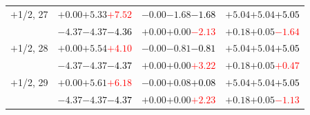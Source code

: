 \documentclass[compress]{beamer}
\begin{document}
\begin{frame}
\begin{tabular}{r | c | c | c}
$+$1/2, 27 & $+0.00$\hspace{0.1 cm}$+5.33$\hspace{0.1 cm}\textcolor{red}{$+7.52$} & $-0.00$\hspace{0.1 cm}$-1.68$\hspace{0.1 cm}\textcolor{black}{$-1.68$} & $+5.04$\hspace{0.1 cm}$+5.04$\hspace{0.1 cm}\textcolor{black}{$+5.05$} \\
           & $-4.37$\hspace{0.1 cm}$-4.37$\hspace{0.1 cm}\textcolor{black}{$-4.36$} & $+0.00$\hspace{0.1 cm}$+0.00$\hspace{0.1 cm}\textcolor{red}{$-2.13$} & $+0.18$\hspace{0.1 cm}$+0.05$\hspace{0.1 cm}\textcolor{red}{$-1.64$} \\
$+$1/2, 28 & $+0.00$\hspace{0.1 cm}$+5.54$\hspace{0.1 cm}\textcolor{red}{$+4.10$} & $-0.00$\hspace{0.1 cm}$-0.81$\hspace{0.1 cm}\textcolor{black}{$-0.81$} & $+5.04$\hspace{0.1 cm}$+5.04$\hspace{0.1 cm}\textcolor{black}{$+5.05$} \\
           & $-4.37$\hspace{0.1 cm}$-4.37$\hspace{0.1 cm}\textcolor{black}{$-4.37$} & $+0.00$\hspace{0.1 cm}$+0.00$\hspace{0.1 cm}\textcolor{red}{$+3.22$} & $+0.18$\hspace{0.1 cm}$+0.05$\hspace{0.1 cm}\textcolor{red}{$+0.47$} \\
$+$1/2, 29 & $+0.00$\hspace{0.1 cm}$+5.61$\hspace{0.1 cm}\textcolor{red}{$+6.18$} & $-0.00$\hspace{0.1 cm}$+0.08$\hspace{0.1 cm}\textcolor{black}{$+0.08$} & $+5.04$\hspace{0.1 cm}$+5.04$\hspace{0.1 cm}\textcolor{black}{$+5.05$} \\
           & $-4.37$\hspace{0.1 cm}$-4.37$\hspace{0.1 cm}\textcolor{black}{$-4.37$} & $+0.00$\hspace{0.1 cm}$+0.00$\hspace{0.1 cm}\textcolor{red}{$+2.23$} & $+0.18$\hspace{0.1 cm}$+0.05$\hspace{0.1 cm}\textcolor{red}{$-1.13$} \\

\end{tabular}
\end{frame}
\end{document}

